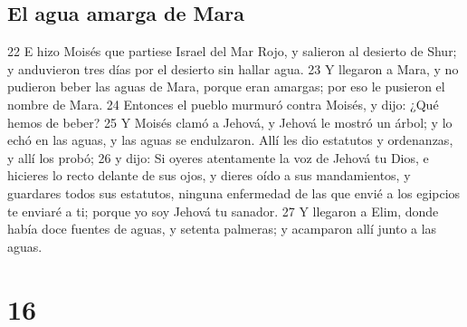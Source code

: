 \section*{El agua amarga de Mara}
22 E hizo Moisés que partiese Israel del Mar Rojo, y salieron al desierto de Shur; y anduvieron tres días por el desierto sin hallar agua.
23 Y llegaron a Mara, y no pudieron beber las aguas de Mara, porque eran amargas; por eso le pusieron el nombre de Mara.
24 Entonces el pueblo murmuró contra Moisés, y dijo: ¿Qué hemos de beber?
25 Y Moisés clamó a Jehová, y Jehová le mostró un árbol; y lo echó en las aguas, y las aguas se endulzaron. Allí les dio estatutos y ordenanzas, y allí los probó;
26 y dijo: Si oyeres atentamente la voz de Jehová tu Dios, e hicieres lo recto delante de sus ojos, y dieres oído a sus mandamientos, y guardares todos sus estatutos, ninguna enfermedad de las que envié a los egipcios te enviaré a ti; porque yo soy Jehová tu sanador.
27 Y llegaron a Elim, donde había doce fuentes de aguas, y setenta palmeras; y acamparon allí junto a las aguas.

\chapter{16}

